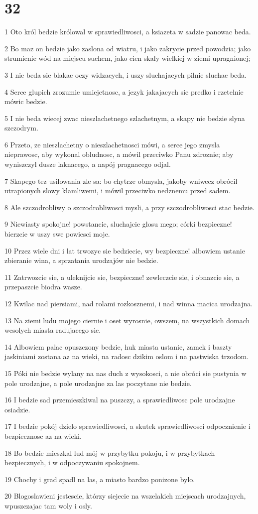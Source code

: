 \chapter{32}

\par 1 Oto król bedzie królowal w sprawiedliwosci, a ksiazeta w sadzie panowac beda.
\par 2 Bo maz on bedzie jako zaslona od wiatru, i jako zakrycie przed powodzia; jako strumienie wód na miejscu suchem, jako cien skaly wielkiej w ziemi upragnionej;
\par 3 I nie beda sie blakac oczy widzacych, i uszy sluchajacych pilnie sluchac beda.
\par 4 Serce glupich zrozumie umiejetnosc, a jezyk jakajacych sie predko i rzetelnie mówic bedzie.
\par 5 I nie beda wiecej zwac nieszlachetnego szlachetnym, a skapy nie bedzie slyna szczodrym.
\par 6 Przeto, ze nieszlachetny o nieszlachetnosci mówi, a serce jego zmysla nieprawosc, aby wykonal obludnosc, a mówil przeciwko Panu zdroznie; aby wyniszczyl dusze laknacego, a napój pragnacego odjal.
\par 7 Skapego tez usilowania zle sa: bo chytrze obmysla, jakoby wniwecz obrócil utrapionych slowy klamliwemi, i mówil przeciwko nedznemu przed sadem.
\par 8 Ale szczodrobliwy o szczodrobliwosci mysli, a przy szczodrobliwosci stac bedzie.
\par 9 Niewiasty spokojne! powstancie, sluchajcie glosu mego; córki bezpieczne! bierzcie w uszy swe powiesci moje.
\par 10 Przez wiele dni i lat trwozyc sie bedziecie, wy bezpieczne! albowiem ustanie zbieranie wina, a sprzatania urodzajów nie bedzie.
\par 11 Zatrwozcie sie, a uleknijcie sie, bezpieczne! zewleczcie sie, i obnazcie sie, a przepaszcie biodra wasze.
\par 12 Kwilac nad piersiami, nad rolami rozkosznemi, i nad winna macica urodzajna.
\par 13 Na ziemi ludu mojego ciernie i oset wyrosnie, owszem, na wszystkich domach wesolych miasta radujacego sie.
\par 14 Albowiem palac opuszczony bedzie, huk miasta ustanie, zamek i baszty jaskiniami zostana az na wieki, na radosc dzikim oslom i na pastwiska trzodom.
\par 15 Póki nie bedzie wylany na nas duch z wysokosci, a nie obróci sie pustynia w pole urodzajne, a pole urodzajne za las poczytane nie bedzie.
\par 16 I bedzie sad przemieszkiwal na puszczy, a sprawiedliwosc pole urodzajne osiadzie.
\par 17 I bedzie pokój dzielo sprawiedliwosci, a skutek sprawiedliwosci odpocznienie i bezpiecznosc az na wieki.
\par 18 Bo bedzie mieszkal lud mój w przybytku pokoju, i w przybytkach bezpiecznych, i w odpoczywaniu spokojnem.
\par 19 Chocby i grad spadl na las, a miasto bardzo ponizone bylo.
\par 20 Blogoslawieni jestescie, którzy siejecie na wszelakich miejscach urodzajnych, wpuszczajac tam woly i osly.

